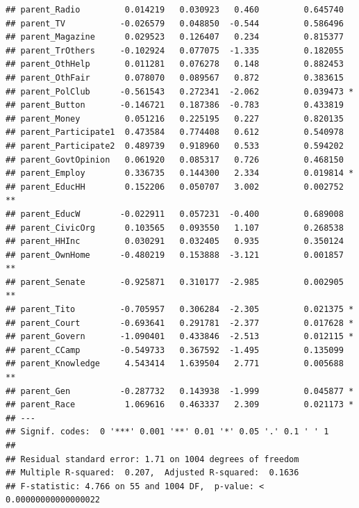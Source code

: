 \documentclass[
]{article}
\newenvironment{Shaded}{\begin{snugshade}}{\end{snugshade}}
\newcommand{\NormalTok}[1]{#1}
\newcommand{\OtherTok}[1]{\textcolor[rgb]{0.56,0.35,0.01}{#1}}
\newcommand{\SpecialCharTok}[1]{\textcolor[rgb]{0.81,0.36,0.00}{\textbf{#1}}}
\newcommand{\StringTok}[1]{\textcolor[rgb]{0.31,0.60,0.02}{#1}}
\begin{document}
\begin{verbatim}
## parent_Radio         0.014219   0.030923   0.460         0.645740    
## parent_TV           -0.026579   0.048850  -0.544         0.586496    
## parent_Magazine      0.029523   0.126407   0.234         0.815377    
## parent_TrOthers     -0.102924   0.077075  -1.335         0.182055    
## parent_OthHelp       0.011281   0.076278   0.148         0.882453    
## parent_OthFair       0.078070   0.089567   0.872         0.383615    
## parent_PolClub      -0.561543   0.272341  -2.062         0.039473 *  
## parent_Button       -0.146721   0.187386  -0.783         0.433819    
## parent_Money         0.051216   0.225195   0.227         0.820135    
## parent_Participate1  0.473584   0.774408   0.612         0.540978    
## parent_Participate2  0.489739   0.918960   0.533         0.594202    
## parent_GovtOpinion   0.061920   0.085317   0.726         0.468150    
## parent_Employ        0.336735   0.144300   2.334         0.019814 *  
## parent_EducHH        0.152206   0.050707   3.002         0.002752 ** 
## parent_EducW        -0.022911   0.057231  -0.400         0.689008    
## parent_CivicOrg      0.103565   0.093550   1.107         0.268538    
## parent_HHInc         0.030291   0.032405   0.935         0.350124    
## parent_OwnHome      -0.480219   0.153888  -3.121         0.001857 ** 
## parent_Senate       -0.925871   0.310177  -2.985         0.002905 ** 
## parent_Tito         -0.705957   0.306284  -2.305         0.021375 *  
## parent_Court        -0.693641   0.291781  -2.377         0.017628 *  
## parent_Govern       -1.090401   0.433846  -2.513         0.012115 *  
## parent_CCamp        -0.549733   0.367592  -1.495         0.135099    
## parent_Knowledge     4.543414   1.639504   2.771         0.005688 ** 
## parent_Gen          -0.287732   0.143938  -1.999         0.045877 *  
## parent_Race          1.069616   0.463337   2.309         0.021173 *  
## ---
## Signif. codes:  0 '***' 0.001 '**' 0.01 '*' 0.05 '.' 0.1 ' ' 1
## 
## Residual standard error: 1.71 on 1004 degrees of freedom
## Multiple R-squared:  0.207,  Adjusted R-squared:  0.1636 
## F-statistic: 4.766 on 55 and 1004 DF,  p-value: < 0.00000000000000022
\end{verbatim}

\begin{Shaded}
\end{Shaded}
\end{document}
